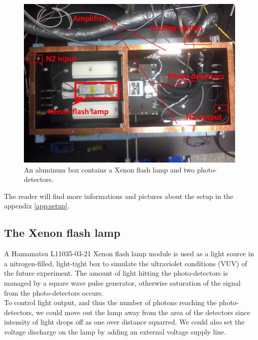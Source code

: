 \documentclass[a4paper, 11pt]{report}%
\newcommand{\xfl}{Xenon flash lamp }
\begin{document}
  \newpage
  \begin{figure}[!hbtp]
    \centering
    \includegraphics[totalheight=.38\textwidth,trim=0cm 7cm 0cm 2.5cm, clip=true]{../Pictures/blabla/box.jpg}%
    \caption{An aluminum box contains a \xfl and two photo-detectors.}
    \label{fig:aluminum_box}
  \end{figure}
  
  The reader will find more informations and pictures about the setup in the appendix \ref{app:setup}. 
  
  \subsection{The \xfl}
  
  A Hamamatsu L11035-03-21 Xenon flash lamp module is used as a light source in a nitrogen-filled, light-tight box to simulate 
  the ultraviolet conditions (VUV) of the future experiment. 
  The amount of light hitting the photo-detectors is managed by a square wave pulse generator, otherwise saturation of the signal 
  from the photo-detectors occurs. 
  \\
  
  To control light output, and thus the number of photons reaching the photo-detectors, we could move out the lamp away from the 
  area of the detectors
  since intensity of light drops off as one over distance squarred. 
  We could also set the voltage discharge on the lamp by adding an external voltage supply line. 
  
\end{document}
